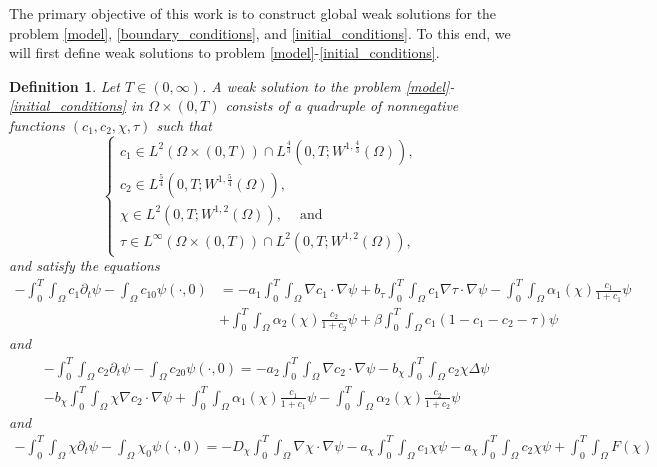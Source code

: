 \documentclass[a4paper,10pt]{article}
\newtheorem{Definition}[Theorem]{Definition}
\theoremstyle{definition}
\begin{document}
\noindent
The primary objective of this work is to construct global weak solutions for the problem \eqref{model}, \eqref{boundary_conditions}, and \eqref{initial_conditions}. To this end, we will first define weak solutions to problem \eqref{model}-\eqref{initial_conditions}.
\begin{Definition}
  \label{solution_definition}
  Let $T \in (0, \infty)$. A weak solution to the problem \eqref{model}-\eqref{initial_conditions} in $\Omega \times (0, T)$ consists of a quadruple of nonnegative functions $(c_1, c_2, \chi, \tau)$ such that
  \begin{equation*}
    \begin{cases}
      c_1 \in L^2(\Omega \times (0, T)) \cap L^{\frac{4}{3}}(0, T; W^{1, \frac{4}{3}}(\Omega)),             \\[5pt]
      c_2 \in L^{\frac{5}{4}}(0, T; W^{1, \frac{5}{4}}(\Omega)),             \\[5pt]
      \chi \in L^2(0, T; W^{1, 2}(\Omega)),   \quad ~\text{and}     \\[5pt]
      \tau \in L^\infty(\Omega \times (0, T)) \cap L^2(0, T; W^{1, 2}(\Omega)),
    \end{cases}
  \end{equation*}
  and satisfy the equations
\begin{align}
  \label{defeq1}
  \nonumber  - \int_0^T \int_\Omega c_{1} \partial_t \psi - \int_\Omega c_{10} \psi(\cdot, 0) & = - a_1 \int_0^T \int_\Omega \nabla c_{1} \cdot \nabla \psi + b_\tau \int_0^T \int_\Omega c_{1} \nabla \tau \cdot \nabla \psi  - \int_0^T \int_\Omega \alpha_1(\chi)\frac{c_{1}}{1 + c_{1}} \psi\\[5pt]
  & + \int_0^T \int_\Omega \alpha_2(\chi)\frac{c_{2}}{1 + c_2} \psi + \beta \int_0^T \int_\Omega c_{1}(1 - c_{1}  -  c_{2}  - \tau )\psi
\end{align}
and
\begin{align}
  \label{defeq2}
 \nonumber  & - \int_0^T \int_\Omega c_{2} \partial_t \psi - \int_\Omega c_{20} \psi(\cdot, 0) = - a_2 \int_0^T \int_\Omega \nabla c_{2} \cdot \nabla \psi  - b_\chi \int_0^T \int_\Omega c_{2} \chi \Delta \psi \\[5pt]
  & - b_\chi \int_0^T \int_\Omega \chi \nabla c_{2 } \cdot \nabla \psi + \int_0^T \int_\Omega \alpha_1(\chi)\frac{c_{1}}{1 + c_{1}} \psi - \int_0^T \int_\Omega \alpha_2(\chi)\frac{c_{2}}{1 + c_{2}} \psi
\end{align}
and
\begin{align}
  \label{defeq3}
 - \int_0^T \int_\Omega \chi \partial_t \psi - \int_\Omega \chi_{0} \psi(\cdot, 0) = - D_\chi \int_0^T \int_\Omega \nabla \chi \cdot \nabla \psi - a_\chi \int_0^T \int_\Omega c_{1}\chi \psi - a_\chi \int_0^T \int_\Omega c_{2}\chi \psi + \int_0^T \int_\Omega F(\chi)

\end{align}
\end{Definition}
\end{document}
